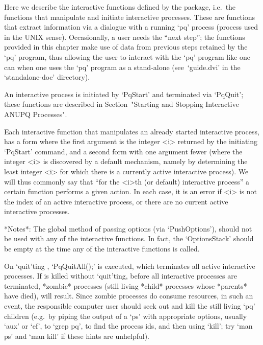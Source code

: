 

Here we describe  the  interactive  functions  defined  by  the  {\ANUPQ}
package, i.e.~the functions  that  manipulate  and  initiate  interactive
{\ANUPQ} processes. These are functions that extract  information  via  a
dialogue with a running `pq' process (process used in  the  UNIX  sense).
Occasionally, a user needs the ``next step''; the functions  provided  in
this chapter make use of data from previous steps retained  by  the  `pq'
program, thus allowing the user to interact with the  `pq'  program  like
one can when one uses the `pq' program as a stand-alone  (see~`guide.dvi'
in the `standalone-doc' directory).

An interactive {\ANUPQ} process is initiated by `PqStart' and  terminated
via `PqQuit'; these functions  are  described  in  Section~"Starting  and
Stopping Interactive ANUPQ Processes".

Each interactive {\ANUPQ} function that manipulates  an  already  started
interactive {\ANUPQ} process, has a form where the first argument is  the
integer <i> returned by the initiating `PqStart' command,  and  a  second
form with one argument fewer (where the integer <i> is  discovered  by  a
default mechanism, namely by determining the least integer <i> for  which
there is a currently active interactive {\ANUPQ} process). We  will  thus
commonly say that ``for  the  <i>th  (or  default)  interactive  {\ANUPQ}
process'' a certain function performs a given action. In each case, it is
an error if <i> is not the index of an  active  interactive  process,  or
there are no current active interactive processes.

*Notes*: 
The global method of passing options (via `PushOptions'), should  not  be
used with any of the interactive functions. In fact,  the  `OptionsStack'
should be empty at the time any of the interactive functions is called.

On `quit'ting {\GAP}, `PqQuitAll();' is executed,  which  terminates  all
active interactive  {\ANUPQ}  processes.  If  {\GAP}  is  killed  without
`quit'ting, before all interactive  {\ANUPQ}  processes  are  terminated,
*zombie* processes (still living *child* processes whose  *parents*  have
died), will result. Since zombie processes do consume resources, in  such
an event, the responsible computer user should  seek  out  and  kill  the
still living `pq' children (e.g.~by piping the  output  of  a  `ps'  with
appropriate options, usually `aux' or `ef', to `grep  pq',  to  find  the
process ids, and then using `kill'; try `man ps' and `man kill' if  these
hints are unhelpful).

